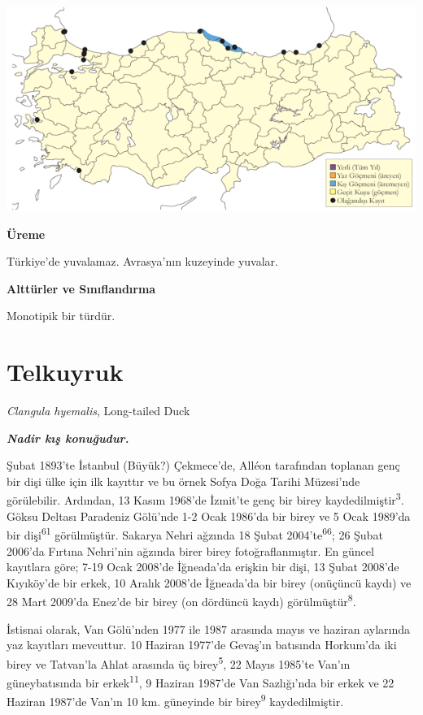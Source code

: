 \documentclass[
  letterpaper,
  DIV=11,
  numbers=noendperiod]{scrreprt}
\begin{document}
\includegraphics{images/harita_Page_029.png}

\textbf{Üreme}

Türkiye'de yuvalamaz. Avrasya'nın kuzeyinde yuvalar.

\textbf{Alttürler ve Sınıflandırma}

Monotipik bir türdür.

\section{Telkuyruk}\label{telkuyruk}

\emph{Clangula hyemalis}, Long-tailed Duck

\textbf{\emph{Nadir kış konuğudur.}}

Şubat 1893'te İstanbul (Büyük?) Çekmece'de, Alléon tarafından toplanan
genç bir dişi ülke için ilk kayıttır ve bu örnek Sofya Doğa Tarihi
Müzesi'nde görülebilir. Ardından, 13 Kasım 1968'de İzmit'te genç bir
birey kaydedilmiştir\textsuperscript{3}. Göksu Deltası Paradeniz
Gölü'nde 1-2 Ocak 1986'da bir birey ve 5 Ocak 1989'da bir
dişi\textsuperscript{61} görülmüştür. Sakarya Nehri ağzında 18 Şubat
2004'te\textsuperscript{66}; 26 Şubat 2006'da Fırtına Nehri'nin ağzında
birer birey fotoğraflanmıştır. En güncel kayıtlara göre; 7-19 Ocak
2008'de İğneada'da erişkin bir dişi, 13 Şubat 2008'de Kıyıköy'de bir
erkek, 10 Aralık 2008'de İğneada'da bir birey (onüçüncü kaydı) ve 28
Mart 2009'da Enez'de bir birey (on dördüncü kaydı)
görülmüştür\textsuperscript{8}.

İstisnai olarak, Van Gölü'nden 1977 ile 1987 arasında mayıs ve haziran
aylarında yaz kayıtları mevcuttur. 10 Haziran 1977'de Gevaş'ın batısında
Horkum'da iki birey ve Tatvan'la Ahlat arasında üç
birey\textsuperscript{5}, 22 Mayıs 1985'te Van'ın güneybatısında bir
erkek\textsuperscript{11}, 9 Haziran 1987'de Van Sazlığı'nda bir erkek
ve 22 Haziran 1987'de Van'ın 10 km. güneyinde bir
birey\textsuperscript{9} kaydedilmiştir.
\end{document}

